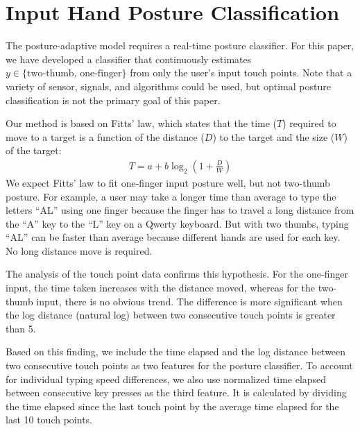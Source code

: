 \documentclass{sigchi}
\begin{document}
\section{Input Hand Posture Classification}\label{sec:posture-classification}
The posture-adaptive model requires a real-time posture classifier.  For this paper, we have developed a classifier that continuously estimates $y \in \{\text{two-thumb, one-finger}\}$ from only the user's input touch points.  Note that a variety of sensor, signals, and algorithms could be used, but optimal posture classification is not the primary goal of this paper.

Our method is based on Fitts' law, which states that the time ($T$) required to
move to a target is a function of the distance ($D$) to the target and the size ($W$) of the target:
\begin{align}
T = a + b\log_2(1 + \frac{D}{W})
\end{align}                                                  
We expect Fitts' law to fit one-finger input posture well, but not two-thumb posture. For example, a user may take a longer time than average to type the letters ``AL'' using one
finger because the finger has to travel a long distance from the ``A'' key to the ``L'' key on
a Qwerty keyboard. But with two thumbs, typing ``AL'' can be faster than average because different hands are used for each key.  No long distance move is required.

%

The analysis of the touch point data confirms this hypothesis. For the
one-finger input, the time taken increases with the distance
moved, whereas for the two-thumb input, there is no obvious trend. The
difference is more significant when the log distance (natural log)
between two consecutive touch points is greater than 5.

Based on this finding, we include the time elapsed and the log distance
between two consecutive touch points as two features for the posture classifier.
To account for individual typing speed differences, we also use normalized time
elapsed between consecutive key presses as the third feature. It is calculated
by dividing the time elapsed since the last touch point by the average time elapsed for the last 10 touch points.
\end{document}
